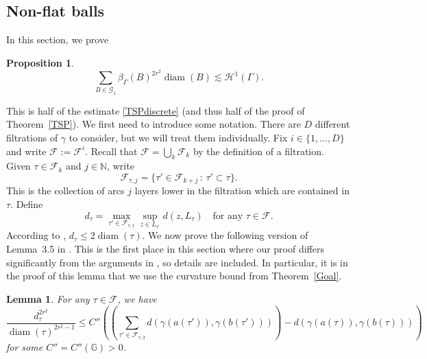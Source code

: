 \documentclass[11pt]{amsart}
\newtheorem{lemma}[theorem]{Lemma}
\newtheorem{proposition}[theorem]{Proposition}
\def\diam{{\rm diam\,}}
\theoremstyle{definition}
\def\diam{\operatorname{diam}}
\numberwithin{theorem}{section} \numberwithin{equation}{section}
\begin{document}
\subsection{Non-flat balls}
In this section, we prove 
\begin{proposition}
\label{TSPdiscreteG1}
$$
\sum_{B \in \mathcal{G}_1} \beta_{\Gamma}(B)^{2r^2} \diam(B) \lesssim \mathcal{H}^1(\Gamma).
$$
\end{proposition}
This is half of the estimate \eqref{TSPdiscrete} (and thus half of the proof of Theorem~\ref{TSP}).
We first need to introduce some notation.
There are $D$ different filtrations of $\gamma$ to consider, but we will treat them individually.
Fix $i \in \{1,\dots,D\}$ and write $\mathcal{F} := \mathcal{F}^i$.
Recall that $\mathcal{F} = \bigcup_k \mathcal{F}_k$
by the definition of a filtration.
Given $\tau \in \mathcal{F}_k$ and $j \in \mathbb{N}$,
write 
$$
\mathcal{F}_{\tau,j} = \{ \tau' \in \mathcal{F}_{k+j} \, : \, \tau' \subset \tau \}.
$$
This is the collection of arcs $j$ layers lower in the filtration which are contained in $\tau$.
Define
$$
d_{\tau} = \max_{\tau' \in \mathcal{F}_{\tau,1}} \sup_{z \in L_{\tau'}} d(z,L_{\tau})
\quad
\text{for any }
\tau \in \mathcal{F}.
$$
According to \cite[Lemma 3.4]{LiSchul},
$d_{\tau} \leq 2 \diam(\tau)$.
We now prove the following version of Lemma~3.5 in \cite{LiSchul}.
This is the first place in this section where our proof differs significantly from the arguments in \cite{LiSchul},
so details are included.
In particular, it is in the proof of this lemma that we use the curvature bound from Theorem~\ref{Goal}.

\begin{lemma}
For any $\tau \in \mathcal{F}$, we have
\begin{equation}
\label{NewLem}
\frac{d_{\tau}^{2r^2}}{\diam(\tau)^{2r^2-1}}
\leq 
C'' \left( \left( \sum_{\tau' \in \mathcal{F}_{\tau,3}} d(\gamma(a(\tau')),\gamma(b(\tau'))) \right) - d(\gamma(a(\tau)),\gamma(b(\tau))) \right)
\end{equation}
for some $C'' = C''(\mathbb{G}) >0$.
\end{lemma}
\end{document}
